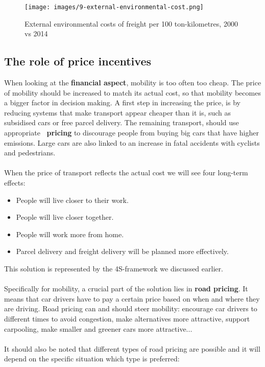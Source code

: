 \documentclass[../summary.tex]{subfiles}
\begin{document}
\begin{figure}[H]
	\centering
	\texttt{[image: images/9-external-environmental-cost.png]}
	\caption{External environmental costs of freight per 100 ton-kilometres, 2000 vs 2014}
	\label{fig:external-environmental-costs}
\end{figure}
\newpage

\subsection{The role of price incentives}

When looking at the \textbf{financial aspect}, mobility is too often too cheap. The price of mobility should be increased to match its actual cost, so that mobility becomes a bigger factor in decision making. A first step in increasing the price, is by reducing systems that make transport appear cheaper than it is, such as subsidised cars or free parcel delivery. The remaining transport, should use appropriate \textbf{\boldmath \COtwo\ pricing} to discourage people from buying big cars that have higher emissions. Large cars are also linked to an increase in fatal accidents with cyclists and pedestrians.
\\\\
When the price of transport reflects the actual cost we will see four long-term effects:
\begin{itemize}
	\setlength{\itemsep}{0pt}
	\item People will live closer to their work.
	\item People will live closer together.
	\item People will work more from home.
	\item Parcel delivery and freight delivery will be planned more effectively.
\end{itemize}
This solution is represented by the 4S-framework we discussed earlier.
\\\\
Specifically for mobility, a crucial part of the solution lies in \textbf{road pricing}. It means that car drivers have to pay a certain price based on when and where they are driving. Road pricing can and should steer mobility: encourage car drivers to different times to avoid congestion, make alternatives more attractive, support carpooling, make smaller and greener cars more attractive...
\\\\
It should also be noted that different types of road pricing are possible and it will depend on the specific situation which type is preferred:
\end{document}

